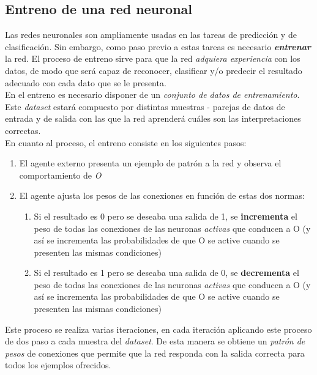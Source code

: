 \subsection{Entreno de una red neuronal}

Las redes neuronales son ampliamente usadas en las tareas de predicción y de clasificación. Sin embargo, como paso previo a estas tareas es necesario \textit{\textbf{entrenar}} la red. El proceso de entreno sirve para que la red \textit{adquiera experiencia} con los datos, de modo que será capaz de reconocer, clasificar y/o predecir el resultado adecuado con cada dato que se le presenta. \\

En el entreno es necesario disponer de un \textit{conjunto de datos de entrenamiento}. Este \textit{dataset} estará compuesto por distintas muestras - parejas de datos de entrada y de salida con las que la red aprenderá cuáles son las interpretaciones correctas. \\

En cuanto al proceso, el entreno consiste en los siguientes pasos: 
\begin{enumerate}
    \item El agente externo presenta un ejemplo de patrón a la red y observa el comportamiento de \textit{O}
    \item El agente ajusta los pesos de las conexiones en función de estas dos normas:
        \begin{enumerate}
        \item Si el resultado es 0 pero se deseaba una salida de 1, se \textbf{incrementa} el peso de todas las conexiones de las neuronas \textit{activas} que conducen a O (y así se incrementa las probabilidades de que O se active cuando se presenten las mismas condiciones)
        \item Si el resultado es 1 pero se deseaba una salida de 0, se \textbf{decrementa} el peso de todas las conexiones de las neuronas \textit{activas} que conducen a O (y así se incrementa las probabilidades de que O se active cuando se presenten las mismas condiciones)
    \end{enumerate}
\end{enumerate}

Este proceso se realiza varias iteraciones, en cada iteración aplicando este proceso de dos paso a cada muestra del \textit{dataset}. De esta manera se obtiene un \textit{patrón de pesos} de conexiones que permite que la red responda con la salida correcta para todos los ejemplos ofrecidos. \\

